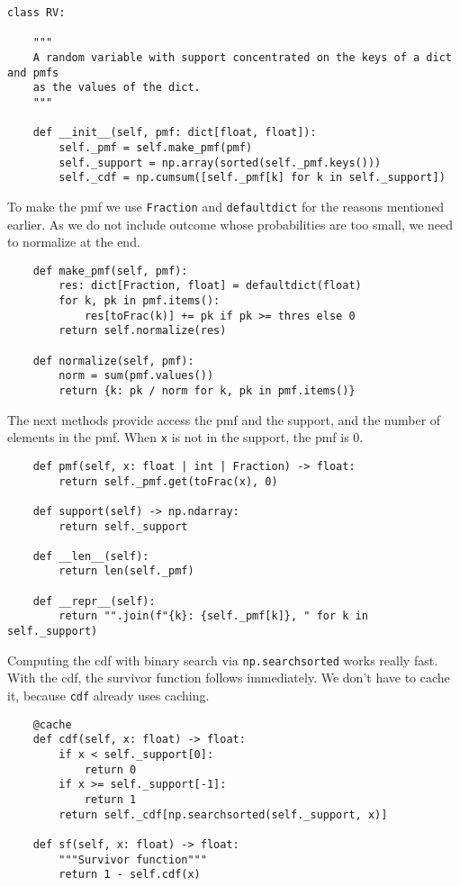 \documentclass[stochastic-or]{subfiles}
\begin{document}
\begin{verbatim}
class RV:

    """
    A random variable with support concentrated on the keys of a dict and pmfs
    as the values of the dict.
    """

    def __init__(self, pmf: dict[float, float]):
        self._pmf = self.make_pmf(pmf)
        self._support = np.array(sorted(self._pmf.keys()))
        self._cdf = np.cumsum([self._pmf[k] for k in self._support])
\end{verbatim}


To make the pmf we use \texttt{Fraction} and \texttt{defaultdict} for the reasons mentioned earlier.
As we do not include outcome whose probabilities are too small, we need to normalize at the end.

\begin{verbatim}
    def make_pmf(self, pmf):
        res: dict[Fraction, float] = defaultdict(float)
        for k, pk in pmf.items():
            res[toFrac(k)] += pk if pk >= thres else 0
        return self.normalize(res)

    def normalize(self, pmf):
        norm = sum(pmf.values())
        return {k: pk / norm for k, pk in pmf.items()}
\end{verbatim}

The next methods provide access the pmf and the support, and the number of elements in the pmf.
When \texttt{x} is not in the support, the pmf is \(0\).
\begin{verbatim}
    def pmf(self, x: float | int | Fraction) -> float:
        return self._pmf.get(toFrac(x), 0)

    def support(self) -> np.ndarray:
        return self._support

    def __len__(self):
        return len(self._pmf)

    def __repr__(self):
        return "".join(f"{k}: {self._pmf[k]}, " for k in self._support)
\end{verbatim}

Computing the cdf with binary search via \texttt{np.searchsorted} works really fast.
With the cdf, the survivor function follows immediately. We don't have to cache it, because \texttt{cdf} already uses caching.
\begin{verbatim}
    @cache
    def cdf(self, x: float) -> float:
        if x < self._support[0]:
            return 0
        if x >= self._support[-1]:
            return 1
        return self._cdf[np.searchsorted(self._support, x)]

    def sf(self, x: float) -> float:
        """Survivor function"""
        return 1 - self.cdf(x)
\end{verbatim}
\end{document}
